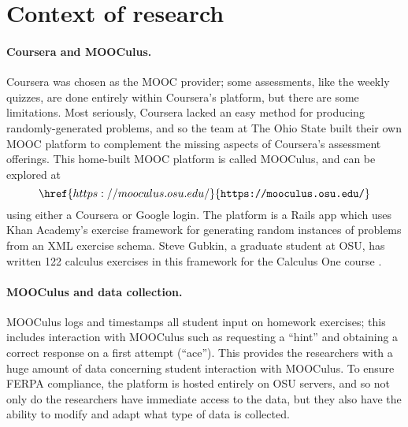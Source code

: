 \documentclass[12pt]{article}
\begin{document}
\section{Context of research}

\paragraph{Coursera and MOOCulus.} 
Coursera was chosen as the MOOC provider; some assessments, like the
weekly quizzes, are done entirely within Coursera's platform, but
there are some limitations.  Most seriously, Coursera lacked an easy
method for producing randomly-generated problems, and so the team at
The Ohio State built their own MOOC platform to complement the missing
aspects of Coursera's assessment offerings.  This home-built MOOC
platform is called MOOCulus, and can be explored at
\[
\href{https://mooculus.osu.edu/}{\texttt{https://mooculus.osu.edu/}}
\]
using either a Coursera or Google login.  The platform is a Rails app
which uses Khan Academy's exercise framework \parencite{khan-academy}
for generating random instances of problems from an XML exercise
schema.  Steve Gubkin, a graduate student at OSU, has written 122
calculus exercises in this framework for the Calculus One
course \parencite{steve-gubkin}.

\paragraph{MOOCulus and data collection.} 
MOOCulus logs and timestamps all student input on homework exercises;
this includes interaction with MOOCulus such as requesting a ``hint''
and obtaining a correct response on a first attempt (``ace'').  This
provides the researchers with a huge amount of data concerning student
interaction with MOOCulus.  To ensure FERPA compliance, the platform
is hosted entirely on OSU servers, and so not only do the researchers
have immediate access to the data, but they also have the ability to
modify and adapt what type of data is collected.
\end{document}
